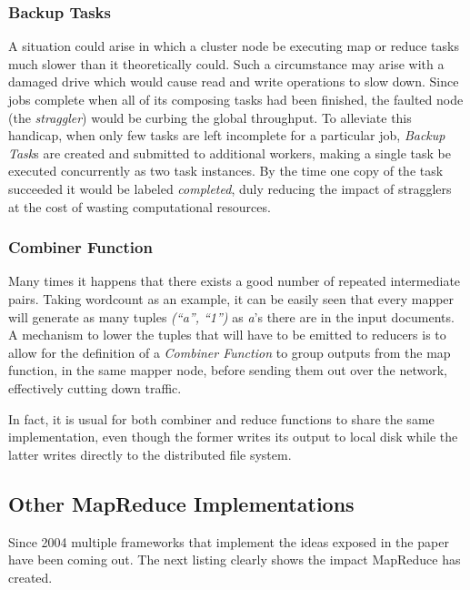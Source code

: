 \subsubsection{Backup Tasks}\label{subsubsec:secundarias}
\noindent A situation could arise in which a cluster node be executing map or reduce tasks much slower than it theoretically could. Such a circumstance may arise with a damaged drive which would cause read and write operations to slow down. Since jobs complete when all of its composing tasks had been finished, the faulted node (the \emph{straggler}) would be curbing the global throughput. To alleviate this handicap, when only few tasks are left incomplete for a particular job, \emph{Backup Task}s are created and submitted to additional workers, making a single task be executed concurrently as two task instances. By the time one copy of the task succeeded it would be labeled \emph{completed}, duly reducing the impact of stragglers at the cost of wasting computational resources.

\subsubsection{Combiner Function}\label{subsubsec:combiner}

\noindent Many times it happens that there exists a good number of repeated intermediate pairs. Taking wordcount as an example, it can be easily seen that every mapper will generate as many tuples \emph{(``a'', ``1'')} as \emph{a}'s there are in the input documents. A mechanism to lower the tuples that will have to be emitted to reducers is to allow for the definition of a \emph{Combiner Function} to group outputs from the map function, in the same mapper node, before sending them out over the network, effectively cutting down traffic.

In fact, it is usual for both combiner and reduce functions to share the same implementation, even though the former writes its output to local disk while the latter writes directly to the distributed file system.

\subsection{Other MapReduce Implementations}\label{subsec:frameworksmapred}
\noindent Since 2004 multiple frameworks that implement the ideas exposed in the paper \cite{googlemapreduce} have been coming out. The next listing clearly shows the impact MapReduce has created.

